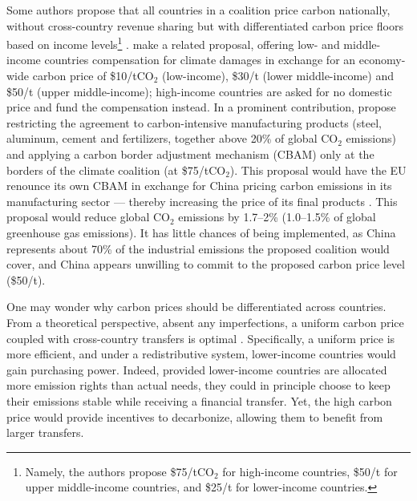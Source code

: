 \documentclass[12pt,english]{article}
\begin{document}
Some authors propose that all countries in a coalition price carbon nationally, without cross-country revenue sharing but with differentiated carbon price floors based on income levels\footnote{Namely, the authors propose \$75/tCO$_\text{2}$ for high-income countries, \$50/t for upper middle-income countries, and \$25/t for lower-income countries.} \citep{parry_proposal_2021,wolfram_building_2025}. \cite{banerjee_grand_2025} make a related proposal, offering low- and middle-income countries compensation for climate damages in exchange for an economy-wide carbon price of \$10/tCO$_\text{2}$ (low-income), \$30/t (lower middle-income) and \$50/t (upper middle-income); high-income countries are asked for no domestic price and fund the compensation instead.
In a prominent contribution, \cite{wolfram_building_2025} propose restricting the agreement to carbon-intensive manufacturing products (steel, aluminum, cement and fertilizers, together above 20\% of global CO$_\text{2}$ emissions) and applying a carbon border adjustment mechanism (CBAM) only at the borders of the climate coalition (at \$75/tCO$_\text{2}$). This proposal would have the EU renounce its own CBAM in exchange for China pricing carbon emissions in its manufacturing sector --- thereby increasing the price of its final products \citep{chateau_global_2024}. This proposal would reduce global CO$_\text{2}$ emissions by 1.7--2\% (1.0--1.5\% of global greenhouse gas emissions). It has little chances of being implemented, as China represents about 70\% of the industrial emissions the proposed coalition would cover, and China appears unwilling to commit to the proposed carbon price level (\$50/t). 

One may wonder why carbon prices should be differentiated across countries. 
From a theoretical perspective, absent any imperfections, a uniform carbon price coupled with cross-country transfers is optimal \citep{aldy_promise_2012}. %
Specifically, a uniform price is more efficient, and under a redistributive system, %
lower-income countries would gain purchasing power. %
Indeed, provided lower-income countries are allocated more emission rights than actual needs, they could in principle choose to keep their emissions stable while receiving
a financial transfer. Yet, the high carbon price would provide incentives to decarbonize, allowing them to benefit from larger transfers. 
\end{document}
